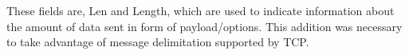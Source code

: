 These fields are, Len and Length, which are used to indicate information about the amount of data sent in form of payload/options.  
This addition was necessary to take advantage of message delimitation supported by TCP.


%
%
%





% 
%
%
%
%
%



